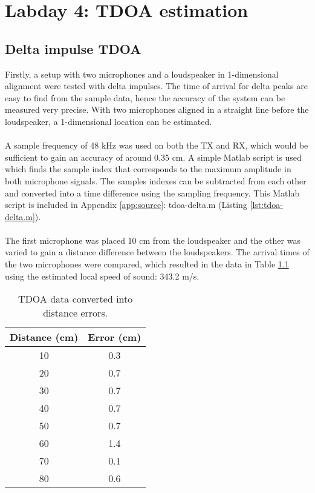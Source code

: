 \documentclass[final]{scrreprt} %
\begin{document}
\chapter{Labday 4: TDOA estimation}
\label{ch:labday4}
\section{Delta impulse TDOA}
Firstly, a setup with two microphones and a loudspeaker in 1-dimensional alignment were tested with delta impulses.
The time of arrival for delta peaks are easy to find from the sample data, hence the accuracy of the system can be measured very precise.
With two microphones aligned in a straight line before the loudspeaker, a 1-dimensional location can be estimated.
\\ \\
A sample frequency of 48 kHz was used on both the TX and RX, which would be sufficient to gain an accuracy of around 0.35 cm.
A simple Matlab script is used which finds the sample index that corresponds to the maximum amplitude in both microphone signals.
The samples indexes can be subtracted from each other and converted into a time difference using the sampling frequency.
This Matlab script is included in Appendix \ref{app:source}: tdoa-delta.m (Listing \ref{lst:tdoa-delta.m}).
\\ \\
The first microphone was placed 10 cm from the loudspeaker and the other was varied to gain a distance difference between the loudspeakers.
The arrival times of the two microphones were compared, which resulted in the data in Table \ref{tab:delta} using the estimated local speed of sound: 343.2 m/s.

\begin{table} [H]
	\centering
	\begin{tabular} { c | c }
	Distance (cm) & Error (cm) \\ \hline
	10 & 0.3 \\
	20 & 0.7 \\
	30 & 0.7 \\
	40 & 0.7 \\
	50 & 0.7 \\
	60 & 1.4 \\
	70 & 0.1 \\
	80 & 0.6 \\
	\end{tabular}
\caption{TDOA data converted into distance errors.}
\label{tab:delta}
\end{table}
\end{document}
